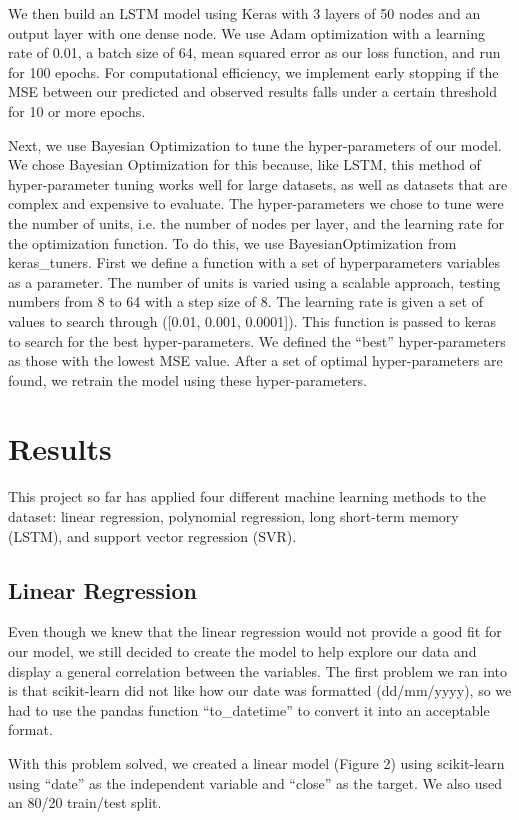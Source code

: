 \documentclass[12pt,a4paper]{article}
\begin{document}
We then build an LSTM model using Keras with 3 layers of 50 nodes and an output layer with one dense node. We use Adam optimization with a learning rate of 0.01, a batch size of 64, mean squared error as our loss function, and run for 100 epochs. For computational efficiency, we implement early stopping if the MSE between our predicted and observed results falls under a certain threshold for 10 or more epochs.

Next, we use Bayesian Optimization to tune the hyper-parameters of our model. We chose Bayesian Optimization for this because, like LSTM, this method of hyper-parameter tuning works well for large datasets, as well as datasets that are complex and expensive to evaluate. The hyper-parameters we chose to tune were the number of units, i.e. the number of nodes per layer, and the learning rate for the optimization function. To do this, we use BayesianOptimization from keras\_tuners. First we define a function with a set of hyperparameters variables as a parameter. The number of units is varied using a scalable approach, testing numbers from 8 to 64 with a step size of 8. The learning rate is given a set of values to search through ([0.01, 0.001, 0.0001]). This function is passed to keras to search for the best hyper-parameters. We defined the “best” hyper-parameters as those with the lowest MSE value. After a set of optimal hyper-parameters are found, we retrain the model using these hyper-parameters. 

\section{Results}
This project so far has applied four different machine learning methods to the dataset: linear regression, polynomial regression, long short-term memory (LSTM), and support vector regression (SVR).

\subsection{Linear Regression}
Even though we knew that the linear regression would not provide a good fit for our model, we still decided to create the model to help explore our data and display a general correlation between the variables. The first problem we ran into is that scikit-learn did not like how our date was formatted (dd/mm/yyyy), so we had to use the pandas function “to\_datetime” to convert it into an acceptable format. 

With this problem solved, we created a linear model (Figure 2) using scikit-learn using “date” as the independent variable and “close” as the target. We also used an 80/20 train/test split.
\end{document}
